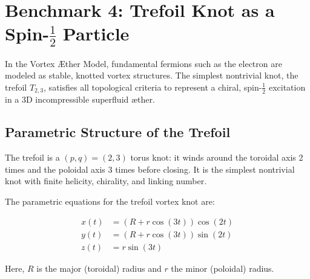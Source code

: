 \section{Benchmark 4: Trefoil Knot as a Spin-\texorpdfstring{$\tfrac{1}{2}$}{1/2} Particle}

In the Vortex Æther Model, fundamental fermions such as the electron are modeled as stable, knotted vortex structures. The simplest nontrivial knot, the trefoil \( T_{2,3} \), satisfies all topological criteria to represent a chiral, spin-\(\tfrac{1}{2}\) excitation in a 3D incompressible superfluid æther.

\subsection{Parametric Structure of the Trefoil}

The trefoil is a \((p, q) = (2, 3)\) torus knot: it winds around the toroidal axis 2 times and the poloidal axis 3 times before closing. It is the simplest nontrivial knot with finite helicity, chirality, and linking number.

The parametric equations for the trefoil vortex knot are:

\begin{equation}
\begin{aligned}
x(t) &= \left(R + r \cos(3t)\right) \cos(2t) \\
y(t) &= \left(R + r \cos(3t)\right) \sin(2t) \\
z(t) &= r \sin(3t)
\end{aligned}
\end{equation}

Here, \(R\) is the major (toroidal) radius and \(r\) the minor (poloidal) radius.

